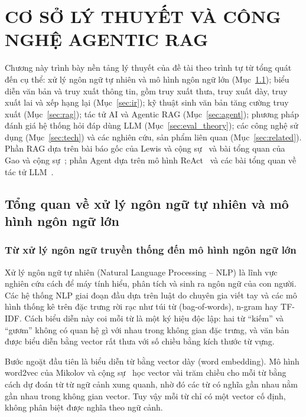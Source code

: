 \chapter{CƠ SỞ LÝ THUYẾT VÀ CÔNG NGHỆ AGENTIC RAG}
\label{chap:theory}

Chương này trình bày nền tảng lý thuyết của đề tài theo trình tự từ tổng quát đến cụ thể: xử lý ngôn ngữ tự nhiên và mô hình ngôn ngữ lớn (Mục~\ref{sec:nlp_llm}); biểu diễn văn bản và truy xuất thông tin, gồm truy xuất thưa, truy xuất dày, truy xuất lai và xếp hạng lại (Mục~\ref{sec:ir}); kỹ thuật sinh văn bản tăng cường truy xuất (Mục~\ref{sec:rag}); tác tử AI và Agentic RAG (Mục~\ref{sec:agent}); phương pháp đánh giá hệ thống hỏi đáp dùng LLM (Mục~\ref{sec:eval_theory}); các công nghệ sử dụng (Mục~\ref{sec:tech}) và các nghiên cứu, sản phẩm liên quan (Mục~\ref{sec:related}). Phần RAG dựa trên bài báo gốc của Lewis và cộng sự~\cite{lewis2020rag} và bài tổng quan của Gao và cộng sự~\cite{gao2023ragsurvey}; phần Agent dựa trên mô hình ReAct~\cite{yao2023react} và các bài tổng quan về tác tử LLM~\cite{wang2024agentsurvey,singh2025agenticrag}.

\section{Tổng quan về xử lý ngôn ngữ tự nhiên và mô hình ngôn ngữ lớn}
\label{sec:nlp_llm}

\subsection{Từ xử lý ngôn ngữ truyền thống đến mô hình ngôn ngữ lớn}
\label{sec:nlp_history}

Xử lý ngôn ngữ tự nhiên (Natural Language Processing -- NLP) là lĩnh vực nghiên cứu cách để máy tính hiểu, phân tích và sinh ra ngôn ngữ của con người. Các hệ thống NLP giai đoạn đầu dựa trên luật do chuyên gia viết tay và các mô hình thống kê trên đặc trưng rời rạc như túi từ (bag-of-words), n-gram hay TF-IDF. Cách biểu diễn này coi mỗi từ là một ký hiệu độc lập: hai từ ``kiếm'' và ``gươm'' không có quan hệ gì với nhau trong không gian đặc trưng, và văn bản được biểu diễn bằng vector rất thưa với số chiều bằng kích thước từ vựng.

Bước ngoặt đầu tiên là biểu diễn từ bằng vector dày (word embedding). Mô hình word2vec của Mikolov và cộng sự~\cite{mikolov2013word2vec} học vector vài trăm chiều cho mỗi từ bằng cách dự đoán từ từ ngữ cảnh xung quanh, nhờ đó các từ có nghĩa gần nhau nằm gần nhau trong không gian vector. Tuy vậy mỗi từ chỉ có một vector cố định, không phân biệt được nghĩa theo ngữ cảnh.

